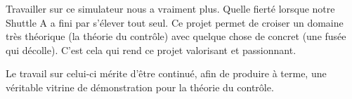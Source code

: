 \documentclass[a4paper,11pt]{article}
\begin{document}
    Travailler sur ce simulateur nous a vraiment plus. Quelle fierté lorsque notre Shuttle A a fini par s'élever tout seul. 
    Ce projet permet de croiser un domaine très théorique (la théorie du contrôle) avec quelque chose de concret (une fusée qui décolle). C'est cela qui rend ce projet valorisant et passionnant.
    
    Le travail sur celui-ci mérite d'être continué, afin de produire à terme, une véritable vitrine de démonstration pour la théorie du contrôle.


\end{document}
